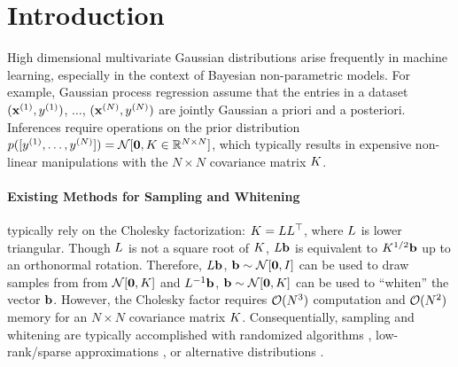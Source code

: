 \section{Introduction}

High dimensional multivariate Gaussian distributions arise frequently in machine learning, especially in the context of Bayesian non-parametric models.
For example, Gaussian process regression assume that the entries in a dataset $(\mathbf{x}^{(1)}, y^{(1)})$, $\ldots$, $(\mathbf{x}^{(N)}, y^{(N)})$ are jointly Gaussian a priori and a posteriori.
Inferences require operations on the prior distribution $p([y^{(1)}, \ldots, y^{(N)}]) = \normaldist{\bzero}{\bK \in \reals^{N \times N}}$,
which typically results in expensive non-linear manipulations with the $N \times N$ covariance matrix $K$.

\paragraph{Existing Methods for Sampling and Whitening}
typically rely on the Cholesky factorization: $K = L L^\top$, where $L$ is lower triangular.
Though $L$ is not a square root of $K$, $L\mathbf{b}$ is equivalent to $K^{1/2} \mathbf{b}$ up to an orthonormal rotation.
Therefore, $L\mathbf{b}$, $\bb \sim \normaldist{\bzero}{\bI}$ can be used to draw samples from from $\normaldist{\bzero}{\bK}$ and $L^{-1} \mathbf{b}$, $\bb \sim \normaldist{\bzero}{\bK}$ can be used to ``whiten'' the vector $\mathbf{b}$.
However, the Cholesky factor requires $\bigo{N^3}$ computation and $\bigo{N^2}$ memory for an $N \times N$ covariance matrix $K$.
Consequentially, sampling and whitening are typically accomplished with randomized algorithms , low-rank/sparse approximations , or alternative distributions .

